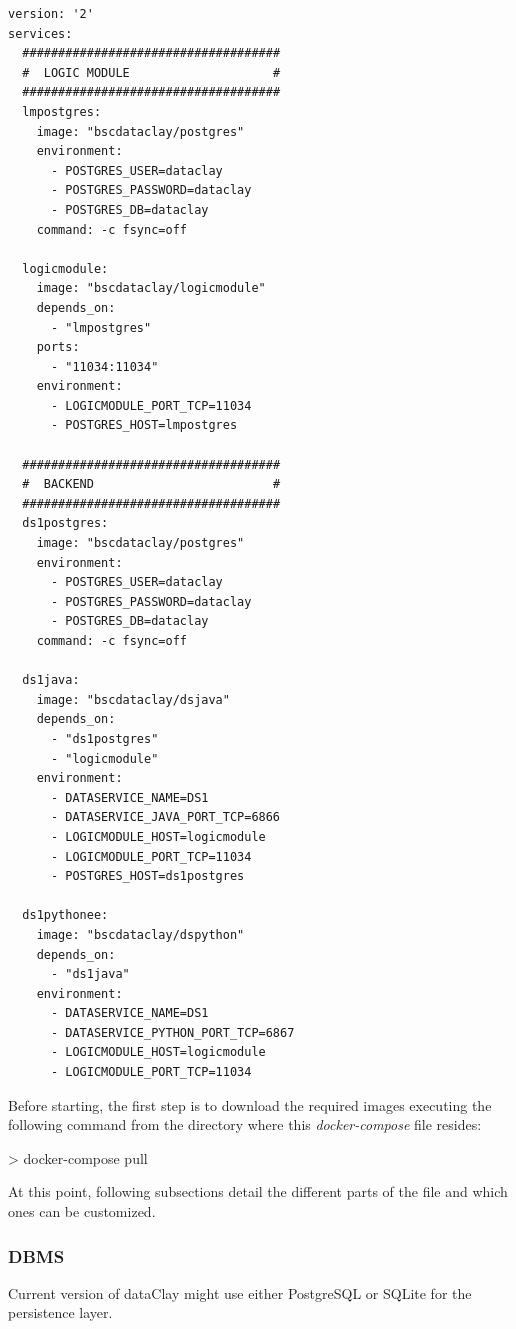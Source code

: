 \begin{tBox}
 \begin{lstlisting}[language=docker-compose-2, frame=none]
version: '2' 
services:
  ####################################
  #  LOGIC MODULE                    #
  ####################################
  lmpostgres:
    image: "bscdataclay/postgres"
    environment:
      - POSTGRES_USER=dataclay
      - POSTGRES_PASSWORD=dataclay
      - POSTGRES_DB=dataclay
    command: -c fsync=off

  logicmodule:
    image: "bscdataclay/logicmodule"
    depends_on:
      - "lmpostgres"
    ports:
      - "11034:11034"
    environment:
      - LOGICMODULE_PORT_TCP=11034
      - POSTGRES_HOST=lmpostgres

  ####################################
  #  BACKEND                         #
  ####################################
  ds1postgres:
    image: "bscdataclay/postgres"
    environment:
      - POSTGRES_USER=dataclay
      - POSTGRES_PASSWORD=dataclay
      - POSTGRES_DB=dataclay
    command: -c fsync=off

  ds1java:
    image: "bscdataclay/dsjava"
    depends_on:
      - "ds1postgres"
      - "logicmodule"
    environment:
      - DATASERVICE_NAME=DS1
      - DATASERVICE_JAVA_PORT_TCP=6866
      - LOGICMODULE_HOST=logicmodule
      - LOGICMODULE_PORT_TCP=11034
      - POSTGRES_HOST=ds1postgres

  ds1pythonee:
    image: "bscdataclay/dspython"
    depends_on:
      - "ds1java"
    environment:
      - DATASERVICE_NAME=DS1
      - DATASERVICE_PYTHON_PORT_TCP=6867
      - LOGICMODULE_HOST=logicmodule
      - LOGICMODULE_PORT_TCP=11034
 \end{lstlisting}
\end{tBox}

Before starting, the first step is to download the required images executing the following command from the directory where this \textit{docker-compose} file resides:
\begin{tBox}
 \begin{bash}
  > docker-compose pull
 \end{bash}
\end{tBox}

At this point, following subsections detail the different parts of the file and which ones can be customized.

\subsubsection{DBMS}
Current version of dataClay might use either PostgreSQL or SQLite for the persistence layer. 

